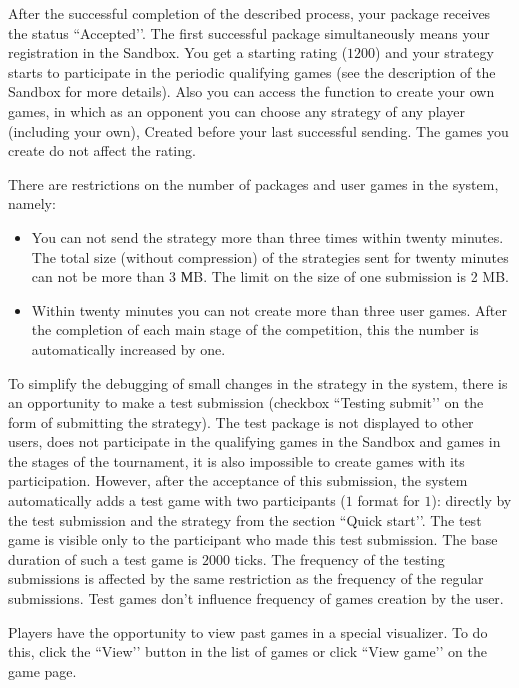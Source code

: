 After the successful completion of the described process, your package receives the status ``Accepted’’. The first successful package simultaneously means
your registration in the Sandbox. You get a starting rating ($1200$) and your strategy starts to participate in the periodic
qualifying games (see the description of the Sandbox for more details). Also you can access the function
to create your own games, in which as an opponent you can choose any strategy of any player (including your own),
Created before your last successful sending. The games you create do not affect the rating.

There are restrictions on the number of packages and user games in the system, namely:
\vspace{-0.15in}
\begin{itemize}
  \item You can not send the strategy more than three times within twenty minutes. The total size (without compression) of the strategies sent for twenty
        minutes can not be more than 3 МB. The limit on the size of one submission is 2 MB.
\vspace{-0.10in}
  \item Within twenty minutes you can not create more than three user games. After the completion of each main stage of the competition, this
        the number is automatically increased by one.
\vspace{-0.10in}
\end{itemize}

To simplify the debugging of small changes in the strategy in the system, there is an opportunity to make a test submission (checkbox ``Testing submit’’
on the form of submitting the strategy). The test package is not displayed to other users, does not participate in the qualifying games in the Sandbox and
games in the stages of the tournament, it is also impossible to create games with its participation. However, after the acceptance of this submission, the system
automatically adds a test game with two participants ($1$ format for $1$): directly by the test submission and the strategy from the section
``Quick start’’. The test game is visible only to the participant who made this test submission. The base duration of such a test game
is $2000$ ticks. The frequency of the testing submissions is affected by the same restriction as the frequency of the regular submissions. Test games don’t influence frequency
of games creation by the user.

Players have the opportunity to view past games in a special visualizer. To do this, click the ``View’’ button in the list of games
or click ``View game’’ on the game page.

